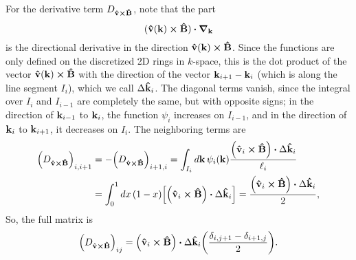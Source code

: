 \documentclass[12pt]{article}
\begin{document}
For the derivative term $D_{\vu{v}\cross\vu{B}}$, note that the part
\begin{equation}
    (\vu{v}(\vb{k})\cross\vu{B})\vdot\grad_{\vb{k}}
\end{equation}
is the directional derivative in the direction $\vu{v}(\vb{k})\cross\vu{B}$. Since the functions are
only defined on the discretized 2D rings in $k$-space, this is the dot product of the vector
$\vu{v}(\vb{k})\cross\vu{B}$ with the direction of the vector $\vb{k}_{i+1} - \vb{k}_i$ (which is
along the line segment $I_i$), which we call $\Delta\vu{k}_i$. The diagonal terms vanish, since the
integral over $I_i$ and $I_{i-1}$ are completely the same, but with opposite signs; in the
direction of $\vb{k}_{i-1}$ to $\vb{k}_i$, the function $\psi_i$ increases on $I_{i-1}$, and in the
direction of $\vb{k}_i$ to $\vb{k}_{i+1}$, it decreases on $I_i$. The neighboring terms are
\begin{equation}
\begin{aligned}
    \qty(D_{\vu{v}\cross\vu{B}})_{i,i+1} &= -\qty(D_{\vu{v}\cross\vu{B}})_{i+1,i}
        = \int_{I_i} \dd{\vb{k}} \psi_i(\vb{k})
        \frac{\qty(\vu{v}_i\cross\vu{B})\vdot\Delta\vu{k}_i}{\ell_i} \\
    &= \int_0^1 \dd{x} (1-x) \qty[\qty(\vu{v}_i\cross\vu{B})\vdot\Delta\vu{k}_i]
    = \frac{\qty(\vu{v}_i\cross\vu{B})\vdot\Delta\vu{k}_i}{2},
\end{aligned}
\end{equation}
So, the full matrix is
\begin{equation}
    \qty(D_{\vu{v}\cross\vu{B}})_{ij} = \qty(\vu{v}_i\cross\vu{B})\vdot\Delta\vu{k}_i
    \qty(\frac{\delta_{i,j+1} - \delta_{i+1,j}}{2}).
\end{equation}
\end{document}

